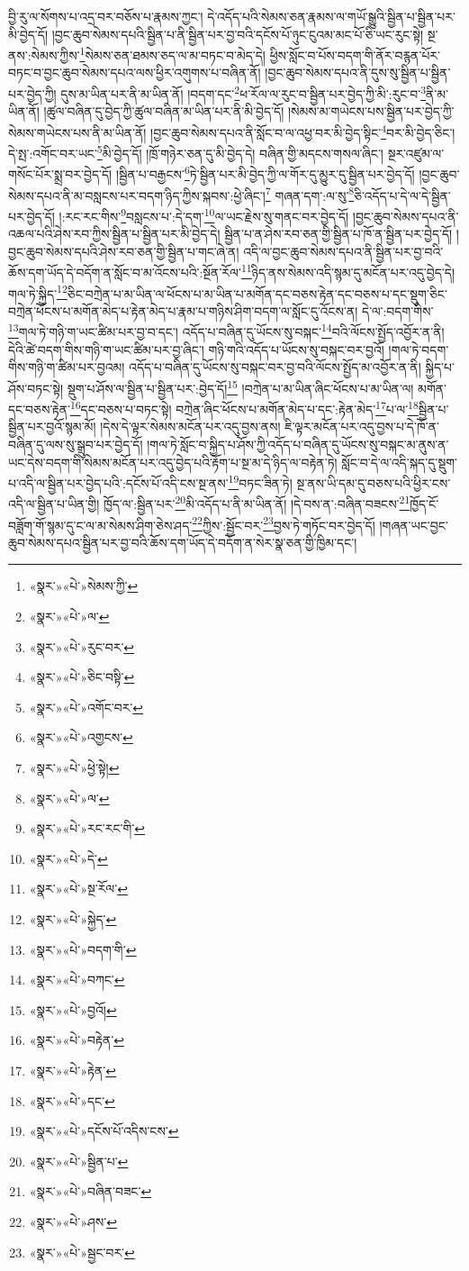 བྱི་རུ་ལ་སོགས་པ་འདྲ་བར་བཅོས་པ་རྣམས་ཀྱང་། དེ་འདོད་པའི་སེམས་ཅན་རྣམས་ལ་གཡོ་སྒྱུའི་སྦྱིན་པ་སྦྱིན་པར་མི་བྱེད་དོ། །བྱང་ཆུབ་སེམས་དཔའི་སྦྱིན་པ་ནི་སྦྱིན་པར་བྱ་བའི་དངོས་པོ་ཉུང་ངུའམ་མང་པོ་ཅི་ཡང་རུང་སྟེ། སྔ་ནས་:སེམས་ཀྱིས་\footnote{«སྣར་»«པེ་»སེམས་ཀྱི་}སེམས་ཅན་ཐམས་ཅད་ལ་མ་བཏང་བ་མེད་དེ། ཕྱིས་སློང་བ་པོས་བདག་གི་ནོར་བརྙན་པོར་བཏང་བ་བྱང་ཆུབ་སེམས་དཔའ་ལས་ཕྱིར་འགུགས་པ་བཞིན་ནོ། །བྱང་ཆུབ་སེམས་དཔའ་ནི་དུས་སུ་སྦྱིན་པ་སྦྱིན་པར་བྱེད་ཀྱི། དུས་མ་ཡིན་པར་ནི་མ་ཡིན་ནོ། །བདག་དང་\footnote{«སྣར་»«པེ་»ལ་}ཕ་རོལ་ལ་རུང་བ་སྦྱིན་པར་བྱེད་ཀྱི་མི་:རུང་བ་\footnote{«སྣར་»«པེ་»རུང་བར་}ནི་མ་ཡིན་ནོ། །ཚུལ་བཞིན་དུ་བྱེད་ཀྱི་ཚུལ་བཞིན་མ་ཡིན་པར་ནི་མི་བྱེད་དོ། །སེམས་མ་གཡེངས་པས་སྦྱིན་པར་བྱེད་ཀྱི་སེམས་གཡེངས་པས་ནི་མ་ཡིན་ནོ། །བྱང་ཆུབ་སེམས་དཔའ་ནི་སློང་བ་ལ་འཕྱ་བར་མི་བྱེད་སྟིང་\footnote{«སྣར་»«པེ་»ཅིང་བསྟི་}བར་མི་བྱེད་ཅིང་། དེ་སྤ་:འགོང་བར་ཡང་\footnote{«སྣར་»«པེ་»འགོང་བར་}མི་བྱེད་དོ། །ཁྲོ་གཉེར་ཅན་དུ་མི་བྱེད་དེ། བཞིན་གྱི་མདངས་གསལ་ཞིང་། སྔར་འཛུམ་ལ་གསོང་པོར་སྨྲ་བར་བྱེད་དོ། །སྦྱིན་པ་བརྒྱངས་\footnote{«སྣར་»«པེ་»འགྱངས་}ཏེ་སྦྱིན་པར་མི་བྱེད་ཀྱི་ལ་གོར་དུ་མྱུར་དུ་སྦྱིན་པར་བྱེད་དོ། །བྱང་ཆུབ་སེམས་དཔའ་ནི་མ་བསླངས་པར་བདག་ཉིད་ཀྱིས་སྐབས་:ཕྱེ་ཞིང་།\footnote{«སྣར་»«པེ་»ཕྱེ་སྟེ།} གཞན་དག་:ལ་སུ་\footnote{«སྣར་»«པེ་»ལ་}ཅི་འདོད་པ་དེ་ལ་དེ་སྦྱིན་པར་བྱེད་དོ། །:རང་རང་གིས་\footnote{«སྣར་»«པེ་»རང་རང་གི་}བསླངས་པ་:དེ་དག་\footnote{«སྣར་»«པེ་»དེ་}ལ་ཡང་རྗེས་སུ་གནང་བར་བྱེད་དོ། །བྱང་ཆུབ་སེམས་དཔའ་ནི་འཆལ་པའི་ཤེས་རབ་ཀྱིས་སྦྱིན་པ་སྦྱིན་པར་མི་བྱེད་དེ། སྦྱིན་པ་ན་ཤེས་རབ་ཅན་གྱི་སྦྱིན་པ་ཁོ་ན་སྦྱིན་པར་བྱེད་དོ། །བྱང་ཆུབ་སེམས་དཔའི་ཤེས་རབ་ཅན་གྱི་སྦྱིན་པ་གང་ཞེ་ན། འདི་ལ་བྱང་ཆུབ་སེམས་དཔའ་ནི་སྦྱིན་པར་བྱ་བའི་ཆོས་དག་ཡོད་དེ་བདོག་ན་སློང་བ་མ་འོངས་པའི་:སྔོན་རོལ་\footnote{«སྣར་»«པེ་»སྔ་རོལ་}ཉིད་ནས་སེམས་འདི་སྙམ་དུ་མངོན་པར་འདུ་བྱེད་དེ། གལ་ཏེ་སྐྱིད་\footnote{«སྣར་»«པེ་»སྐྱེད་}ཅིང་བཀྲེན་པ་མ་ཡིན་ལ་ཕོངས་པ་མ་ཡིན་པ་མགོན་དང་བཅས་རྟེན་དང་བཅས་པ་དང་སྡུག་ཅིང་བཀྲེན་ཕོངས་པ་མགོན་མེད་པ་རྟེན་མེད་པ་རྣམ་པ་གཉིས་ཤིག་བདག་ལ་སློང་དུ་འོངས་ན། དེ་ལ་:བདག་གིས་\footnote{«སྣར་»«པེ་»བདག་གི་}གལ་ཏེ་གཉི་ག་ཡང་ཚིམ་པར་བྱ་བ་དང་། འདོད་པ་བཞིན་དུ་ཡོངས་སུ་བསྐང་\footnote{«སྣར་»«པེ་»བཀང་}བའི་ལོངས་སྤྱོད་འབྱོར་ན་ནི། དེའི་ཚེ་བདག་གིས་གཉི་ག་ཡང་ཚིམ་པར་བྱ་ཞིང་། གཉི་གའི་འདོད་པ་ཡོངས་སུ་བསྐང་བར་བྱའོ། །གལ་ཏེ་བདག་གིས་གཉི་ག་ཚིམ་པར་བྱའམ། འདོད་པ་བཞིན་དུ་ཡོངས་སུ་བསྐང་བར་བྱ་བའི་ལོངས་སྤྱོད་མ་འབྱོར་ན་ནི། སྐྱིད་པ་ཤོས་བཏང་སྟེ། སྡུག་པ་ཤོས་ལ་སྦྱིན་པ་སྦྱིན་པར་:བྱེད་དོ།\footnote{«སྣར་»«པེ་»བྱའོ།} །བཀྲེན་པ་མ་ཡིན་ཞིང་ཕོངས་པ་མ་ཡིན་ལ། མགོན་དང་བཅས་རྟེན་\footnote{«སྣར་»«པེ་»བརྟེན་}དང་བཅས་པ་བཏང་སྟེ། བཀྲེན་ཞིང་ཕོངས་པ་མགོན་མེད་པ་དང་:རྟེན་མེད་\footnote{«སྣར་»«པེ་»རྟེན་}པ་ལ་\footnote{«སྣར་»«པེ་»དང་}སྦྱིན་པ་སྦྱིན་པར་བྱའོ་སྙམ་མོ། །དེས་དེ་ལྟར་སེམས་མངོན་པར་འདུ་བྱས་ནས། ཇི་ལྟར་མངོན་པར་འདུ་བྱས་པ་དེ་ཁོ་ན་བཞིན་དུ་ལས་སུ་སྒྲུབ་པར་བྱེད་དོ། །གལ་ཏེ་སློང་བ་སྐྱིད་པ་ཤོས་ཀྱི་འདོད་པ་བཞིན་དུ་ཡོངས་སུ་བསྐང་མ་ནུས་ན་ཡང་དེས་བདག་གི་སེམས་མངོན་པར་འདུ་བྱེད་པའི་རྟོག་པ་སྔ་མ་དེ་ཉིད་ལ་བརྟེན་ཏེ། སློང་བ་དེ་ལ་འདི་སྐད་དུ་སྡུག་པ་འདི་ལ་སྦྱིན་པར་བྱེད་པའི་:དངོས་པོ་འདི་ངས་སྔ་ནས་\footnote{«སྣར་»«པེ་»དངོས་པོ་འདིས་ངས་}བཏང་ཟིན་ཏེ། སྔ་ནས་ཡི་དམ་དུ་བཅས་པའི་ཕྱིར་ངས་འདི་ལ་སྦྱིན་པ་ཡིན་གྱི། ཁྱོད་ལ་:སྦྱིན་པར་\footnote{«སྣར་»«པེ་»སྦྱིན་པ་}མི་འདོད་པ་ནི་མ་ཡིན་ནོ། །དེ་བས་ན་:བཞིན་བཟངས་\footnote{«སྣར་»«པེ་»བཞིན་བཟང་}ཁྱོད་ངོ་བཟློག་གོ་སྙམ་དུ་ང་ལ་མ་སེམས་ཤིག་ཅེས་ཤད་\footnote{«སྣར་»«པེ་»ཤས་}ཀྱིས་:སྦྱོང་བར་\footnote{«སྣར་»«པེ་»སྦྱང་བར་}བྱས་ཏེ་གཏོང་བར་བྱེད་དོ། །གཞན་ཡང་བྱང་ཆུབ་སེམས་དཔའ་སྦྱིན་པར་བྱ་བའི་ཆོས་དག་ཡོད་དེ་བདོག་ན་སེར་སྣ་ཅན་གྱི་ཁྱིམ་དང་། 